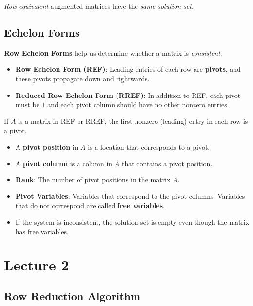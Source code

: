\documentclass[12pt, letterpaper]{article}
\begin{document}
\textit{Row equivalent} augmented matrices have the \textit{same solution set}.
\medskip

\subsection*{Echelon Forms}

\textbf{Row Echelon Forms} help us determine whether a matrix is
\textit{consistent}.

\begin{itemize}
  \item \textbf{Row Echelon Form (REF)}: Leading entries of each row
    are \textbf{pivots}, and these pivots propagate down and rightwards.
  \item \textbf{Reduced Row Echelon Form (RREF)}: In addition to REF,
    each pivot must be $ 1 $ and each pivot column should have no
    other nonzero entries.
\end{itemize}

If $ A $ is a matrix in REF or RREF, the first nonzero (leading)
entry in each row is a pivot.
\begin{itemize}
  \item A \textbf{pivot position} in $ A $ is a location that
    corresponds to a pivot.
  \item A \textbf{pivot column} is a column in $ A $ that contains a
    pivot position.
  \item \textbf{Rank}: The number of pivot positions in the matrix $ A $.
  \item \textbf{Pivot Variables}: Variables that correspond to the
    pivot columns. Variables that do not correspond are called
    \textbf{free variables}.
  \item If the system is inconsistent, the solution set is empty even
    though the matrix has free variables. %
\end{itemize}

\section*{Lecture 2}

\subsection*{Row Reduction Algorithm}
\end{document}

